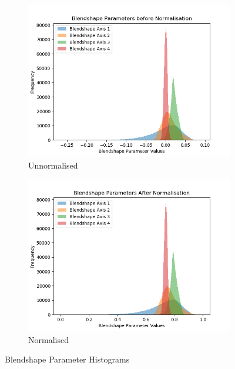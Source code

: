 \begin{figure}[h!]
    \centering
    \begin{subfigure}[b]{0.49\textwidth}
        \includegraphics[width=\textwidth]{figures/dataset/shape_params_unnormalised_hist.png}
        \caption{Unnormalised}\label{fig:hist_unnorm}
    \end{subfigure}
    \begin{subfigure}[b]{0.49\textwidth}
        \includegraphics[width=\textwidth]{figures/dataset/shape_params_normalised_hist.png}
        \caption{Normalised}\label{fig:hist_norm}
    \end{subfigure}
    \caption{Blendshape Parameter Histograms}
\end{figure}


